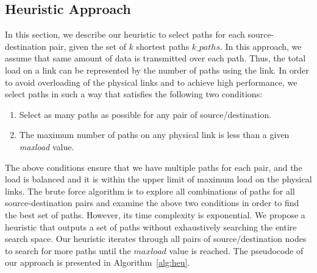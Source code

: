 \subsection{Heuristic Approach}
\label{sec:heuristic}

In this section, we describe our heuristic to select paths for each source-destination pair, given the set of $k$ shortest paths $k\_paths$. In this approach, we assume that same amount of data is transmitted over each path. Thus, the total load on a link can be represented by the number of paths using the link. In order to avoid overloading of the physical links and to achieve high performance, we select paths in such a way that satisfies the following two conditions:
\begin{enumerate}
\item Select as many paths as possible for any pair of source/destination. 
\item The maximum number of paths on any physical link is less than a given \textit{maxload} value.
\end{enumerate}
The above conditions ensure that we have multiple paths for each pair, and the load is balanced and it is within the upper limit of maximum load on the physical links. The brute force algorithm is to explore all combinations of paths for all source-destination pairs and examine the above two conditions in order to find the best set of paths. However, its time complexity is exponential. We propose a heuristic that outputs a set of paths without exhaustively searching the entire search space. Our heuristic iterates through all pairs of source/destination nodes to search for more paths until the $maxload$ value is reached. The pseudocode of our approach is presented in Algorithm~\ref{alg:heu}. %
